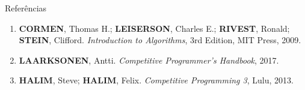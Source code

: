 \begin{frame}[fragile]{Referências}

    \begin{enumerate}
        \item \textbf{CORMEN}, Thomas H.; \textbf{LEISERSON}, Charles E.; \textbf{RIVEST},
            Ronald; \textbf{STEIN}, Clifford. \textit{Introduction to Algorithms}, 3rd Edition,
            MIT Press, 2009.

        \item \textbf{LAARKSONEN}, Antti. \textit{Competitive Programmer's Handbook}, 2017.

        \item \textbf{HALIM}, Steve; \textbf{HALIM}, Felix. \textit{Competitive Programming 3}, Lulu, 2013.
    \end{enumerate}

\end{frame}

